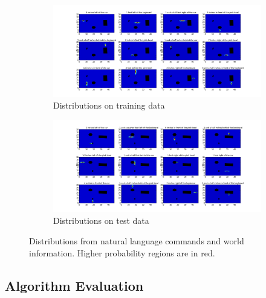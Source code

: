 \documentclass[12pt,letterpaper]{article}
\begin{document}
\begin{figure}
\centering
\begin{subfigure}{.5\textwidth}
  \centering
  \centerline{\includegraphics[scale=0.5]{images/all_commands_training.png}}
  \caption{ Distributions on training data}
  \label{fig:sub1}
\end{subfigure}
\begin{subfigure}{.5\textwidth}
  \centering
  \centerline{\includegraphics[scale=0.5]{images/all_commands_test.png}}
  \caption{Distributions on test data}
  \label{fig:sub2}
\end{subfigure}
\caption{Distributions from natural language commands and world information. Higher probability regions are in red.}
\label{fig:plot_distributions}
\end{figure}

\subsection{Algorithm Evaluation}
\end{document}
